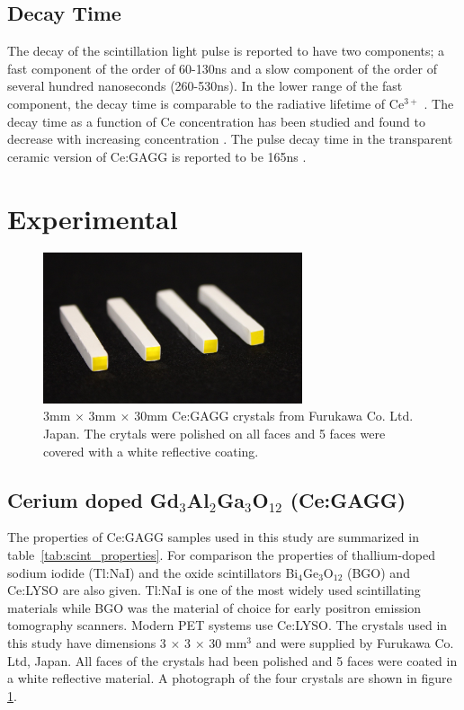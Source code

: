 \documentclass[journal]{IEEEtran}
\begin{document}
\subsection{Decay Time}

The decay of the scintillation light pulse is reported to have two components; a fast component of the order of 60-130ns and a slow component of the order of several hundred nanoseconds (260-530ns). In the lower range of the fast component, the decay time is comparable to the radiative lifetime of Ce$^{3+}$ \cite{kamada:sc_scint}. The decay time as a function of Ce concentration has been studied and found to decrease with increasing concentration \cite{gagg:kamada03}. The pulse decay time in the transparent ceramic version of Ce:GAGG is reported to be 165ns \cite{yan:gagg}. 

\section{Experimental}

\begin{figure}[tb]																			
\centering
\includegraphics[width=3in]{gagg_crystals.jpg}
\caption{3mm $\times$ 3mm $\times$ 30mm Ce:GAGG crystals from Furukawa Co. Ltd. Japan. The crytals were polished on all faces and 5 faces were covered with a white reflective coating.}
\label{fig:GAGG}
\end{figure}

%
%
\subsection{Cerium doped Gd$_{3}$Al$_{2}$Ga$_{3}$O$_{12}$ (Ce:GAGG)}
The properties of Ce:GAGG samples used in this study are summarized in table~\ref{tab:scint_properties}. For comparison the properties of thallium-doped sodium iodide (Tl:NaI) and the oxide scintillators Bi$_{4}$Ge$_{3}$O$_{12}$ (BGO) and Ce:LYSO are also given. Tl:NaI is one of the most widely used scintillating materials while BGO was the material of choice for early positron emission tomography scanners. Modern PET systems use Ce:LYSO. The crystals used in this study have dimensions 3 $\times$ 3 $\times$ 30 mm$^{3}$ and were supplied by Furukawa Co. Ltd, Japan. All faces of the crystals had been polished and 5 faces were coated in a white reflective material. A photograph of the four crystals are shown in figure \ref{fig:GAGG}. 
%
\end{document}
